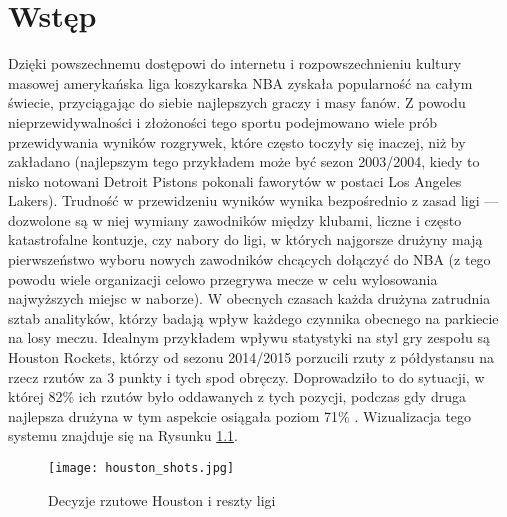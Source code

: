 \documentclass[inzynierska]{pwr_wmat_praca_dyplomowa}
\theoremstyle{plain}
\numberwithin{theorem}{chapter}
\theoremstyle{definition}
\numberwithin{theorem}{chapter}
\begin{document}
\frontmatter
\maketitle
\mainmatter
\tableofcontents

{\backmatter \chapter{Wstęp}}
Dzięki powszechnemu dostępowi do internetu i rozpowszechnieniu kultury masowej amerykańska liga koszykarska NBA zyskała popularność na całym świecie, przyciągając do siebie najlepszych graczy i masy fanów. Z powodu nieprzewidywalności i złożoności tego sportu podejmowano wiele prób przewidywania wyników rozgrywek, które często toczyły się inaczej, niż by zakładano (najlepszym tego przykładem może być sezon 2003/2004, kiedy to nisko notowani Detroit Pistons pokonali faworytów w postaci Los Angeles Lakers). Trudność w przewidzeniu wyników wynika bezpośrednio z zasad ligi --- dozwolone są w niej wymiany zawodników między klubami, liczne i często katastrofalne kontuzje, czy nabory do ligi, w których najgorsze drużyny mają pierwszeństwo wyboru nowych zawodników chcących dołączyć do NBA (z tego powodu wiele organizacji celowo przegrywa mecze w celu wylosowania najwyższych miejsc w naborze). W obecnych czasach każda drużyna zatrudnia sztab analityków, którzy badają wpływ każdego czynnika obecnego na parkiecie na losy meczu. Idealnym przykładem wpływu statystyki na styl gry zespołu są Houston Rockets, którzy od sezonu 2014/2015 porzucili rzuty z półdystansu na rzecz rzutów za 3 punkty i tych spod obręczy. Doprowadziło to do sytuacji, w której 82\% ich rzutów było oddawanych z tych pozycji, podczas gdy druga najlepsza drużyna w tym aspekcie osiągała poziom 71\% \cite{houston}. Wizualizacja tego systemu znajduje się na Rysunku \ref{houston_shots}.
\begin{figure}[h]
	\hspace*{-1cm}
	\texttt{[image: houston\_shots.jpg]}
	\caption{Decyzje rzutowe Houston i reszty ligi}\label{houston_shots}
	\centering
\end{figure}
\end{document}
